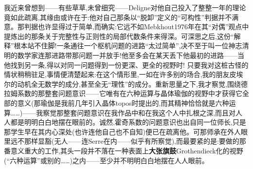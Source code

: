 \noindent 我近来曾想到——有些草草,未曾细究——Deligne对他自己投入了整整一年的理论竟如此疏离,其缘由或许在于:他对自己那条以“脱卸”定义的“可构性”判据并不满意。那判据也许显得过于简单,而确实:它远不如Mebkhout1976年在其“对偶”观点中提炼出的那条关于完整性与正则性的局部代数条件来得深。可深思之后,这份“解释”根本站不住脚!一条通往一个枢机问题的进路“太过简单”,\dmark{}决不至于叫一位神志清明的数学家连那进路带那问题一并放手!他至多会在某天丢下他最初的进路——当他找到另一条,得以对同一问题得到一份更深、更全的视野时!
\noindent 只要我对这桩古怪的情状稍稍驻足,事情便清楚起来:在这个情形里,一如在许多别的场合,我的朋友皮埃尔的动机全无数学的成分,甚至全无“理性”的成分。重新思量之下,我才察觉,围绕德拉姆系数的那整套问题意识——它唯有在六种运算与晶体瑜伽的视野中才获得它全部的意义(那瑜伽是我前几年引入晶体topos时提出的,而其精神恰恰就是六种运算……)——我察觉那整套问题意识在我作品中和在我这个人中扎根之深,而且对人人都是明明白白地摆在眼前的。诚然,霍奇系数的问题意识也出自同一位师长,只是那学生早在其内心深处(也许连他自己也不自知)便已在疏离他。可那师承在外人眼里远不那样显豁(无人——连Serre在内——似乎有所察觉),而最要紧的是:要做的那番意义重大的工作,其头一段并不落在一种表面上\textbf{大张旗鼓}Grothendieck化的视野(“六种运算”或别的……)之内——至少并不明明白白地摆在人人眼前。

